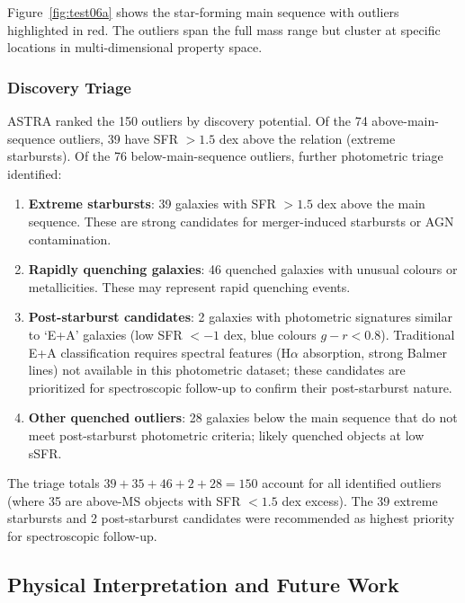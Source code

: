 \documentclass[usenatbib]{rasti}
\begin{document}
Figure~\ref{fig:test06a} shows the star-forming main sequence with outliers highlighted in red. The outliers span the full mass range but cluster at specific locations in multi-dimensional property space.

\subsubsection{Discovery Triage}

ASTRA ranked the 150 outliers by discovery potential. Of the 74 above-main-sequence outliers, 39 have SFR $> 1.5$ dex above the relation (extreme starbursts). Of the 76 below-main-sequence outliers, further photometric triage identified:

\begin{enumerate}
\item \textbf{Extreme starbursts}: 39 galaxies with SFR $> 1.5$ dex above the main sequence. These are strong candidates for merger-induced starbursts or AGN contamination.
\item \textbf{Rapidly quenching galaxies}: 46 quenched galaxies with unusual colours or metallicities. These may represent rapid quenching events.
\item \textbf{Post-starburst candidates}: 2 galaxies with photometric signatures similar to `E+A' galaxies (low SFR $< -1$ dex, blue colours $g-r < 0.8$). Traditional E+A classification requires spectral features (H$\alpha$ absorption, strong Balmer lines) not available in this photometric dataset; these candidates are prioritized for spectroscopic follow-up to confirm their post-starburst nature.
\item \textbf{Other quenched outliers}: 28 galaxies below the main sequence that do not meet post-starburst photometric criteria; likely quenched objects at low sSFR.
\end{enumerate}

The triage totals $39 + 35 + 46 + 2 + 28 = 150$ account for all identified outliers (where 35 are above-MS objects with SFR $< 1.5$ dex excess). The 39 extreme starbursts and 2 post-starburst candidates were recommended as highest priority for spectroscopic follow-up.

\subsection{Physical Interpretation and Future Work}
\end{document}
